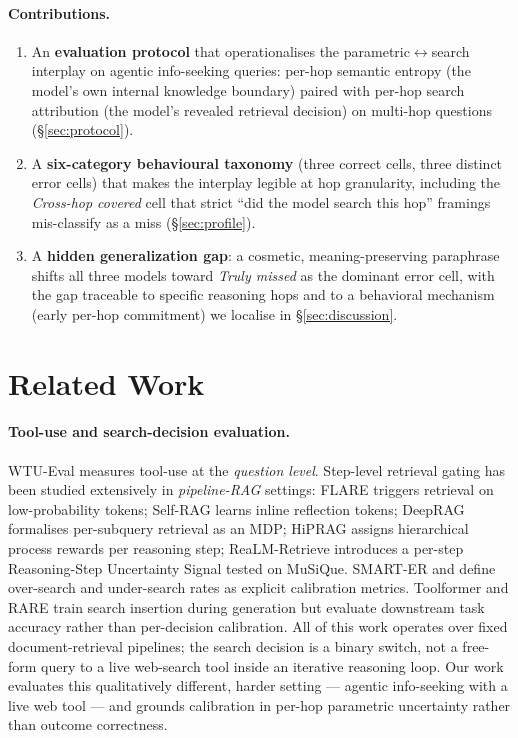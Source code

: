 \documentclass[10pt,letterpaper]{article}
\begin{document}
\paragraph{Contributions.}
\begin{enumerate}[leftmargin=*,itemsep=2pt]
\item An \textbf{evaluation protocol} that operationalises the parametric$\leftrightarrow$search
interplay on agentic info-seeking queries: per-hop semantic entropy (the model's own
internal knowledge boundary) paired with per-hop search attribution (the model's
revealed retrieval decision) on multi-hop questions (\S\ref{sec:protocol}).
\item A \textbf{six-category behavioural taxonomy} (three correct cells, three distinct
error cells) that makes the interplay legible at hop granularity, including the
\emph{Cross-hop covered} cell that strict ``did the model search this hop'' framings
mis-classify as a miss (\S\ref{sec:profile}).
\item A \textbf{hidden generalization gap}: a cosmetic, meaning-preserving paraphrase
shifts all three models toward \emph{Truly missed} as the dominant error cell, with
the gap traceable to specific reasoning hops and to a behavioral mechanism (early
per-hop commitment) we localise in \S\ref{sec:discussion}.
\end{enumerate}

\section{Related Work}

\paragraph{Tool-use and search-decision evaluation.}
WTU-Eval \citep{wtu2024} measures tool-use at the \emph{question level}. Step-level
retrieval gating has been studied extensively in \emph{pipeline-RAG} settings: FLARE
\citep{flare2023} triggers retrieval on low-probability tokens; Self-RAG
\citep{selfrag2024} learns inline reflection tokens; DeepRAG \citep{deeprag2025}
formalises per-subquery retrieval as an MDP; HiPRAG \citep{hiprag2025} assigns
hierarchical process rewards per reasoning step; ReaLM-Retrieve
\citep{realmretrieve2026} introduces a per-step Reasoning-Step Uncertainty Signal
tested on MuSiQue. SMART-ER \citep{smarter2025} and \citet{betaGRPO2025} define
over-search and under-search rates as explicit calibration metrics. Toolformer
\citep{toolformer2023} and RARE \citep{rare2025} train search insertion during
generation but evaluate downstream task accuracy rather than per-decision calibration.
All of this work operates over fixed document-retrieval pipelines; the search decision
is a binary switch, not a free-form query to a live web-search tool inside an
iterative reasoning loop. Our work evaluates this qualitatively different, harder
setting --- agentic info-seeking with a live web tool --- and grounds calibration in
per-hop parametric uncertainty rather than outcome correctness.
\end{document}
